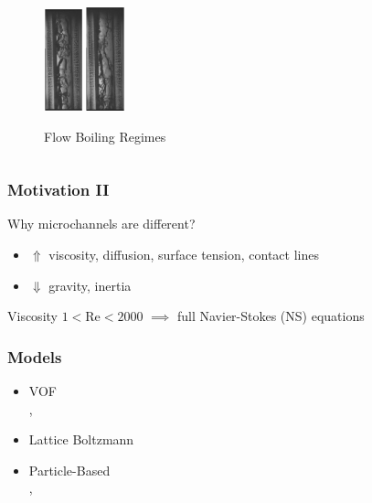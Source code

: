 \begin{frame}
\begin{columns}
\begin{column}{0.5\textwidth}
\begin{figure}
        \includegraphics[width=1.1cm]{exp04.png}
        \includegraphics[width=1.1cm]{exp05.png}
        \caption{Flow Boiling Regimes~\footnotemark}
        \label{fig:self}
      \end{figure}
    \end{column}
  \end{columns}
\end{frame}

\begin{frame}
  \frametitle{Motivation II}
  \begin{block}{Why microchannels are different?}
    \begin{itemize}
    \item $\Uparrow$ viscosity, diffusion, surface tension, contact lines
    \item $\Downarrow$ gravity, inertia
    \end{itemize}
  \end{block}

  \begin{block}{Viscosity}
    $1<\text{Re}<2000$ $\implies$ full Navier-Stokes (NS) equations~\footnotemark
  \end{block}
\end{frame}

\begin{frame}
  \frametitle{Models}
  \begin{itemize}
  \item VOF \\
    , \\
  \item Lattice Boltzmann \\
  \item Particle-Based \\
    , \\ 
  \end{itemize}
\end{frame}

